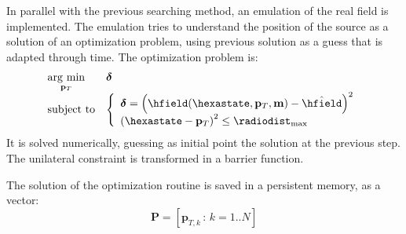 In parallel with the previous searching method, an emulation of the real field is implemented. The emulation tries to understand the position of the source as a solution of an optimization problem, using previous solution as a guess that is adapted through time. The optimization problem is:
\begin{equation}
\begin{array}{ll}
\underset{\mathbf{p}_T}{\mathrm{arg~min}} & \boldsymbol{\delta} \\
\mathrm{subject~to} & 	\left\{ \begin{array}{l}
							\boldsymbol{\delta} = \braces{\hfield(\hexastate,\mathbf{p}_T, \mathbf{m}) - \hat{\hfield}}^2 \\
							\braces{\hexastate - \mathbf{p}_T}^2  \leq  {\radiodist_{\mathrm{max}}}
						\end{array} \right. \\ 
\end{array}
\end{equation}
It is solved numerically, guessing as initial point the solution at the previous step. The unilateral constraint is transformed in a barrier function.

The solution of the optimization routine is saved in a persistent memory, as a vector:
\[ \mathbf{P} = [ \mathbf{p}_{T,k} \,:\, k=1..N ] \]

